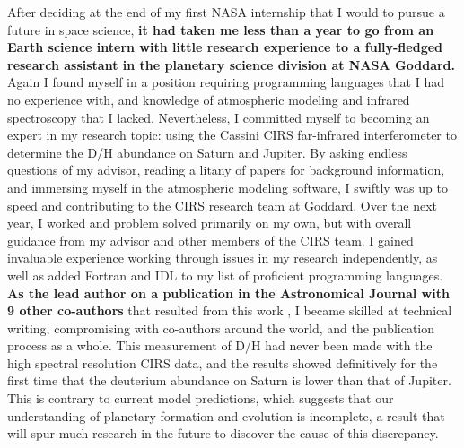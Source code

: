 After deciding at the end of my  first NASA internship that I would to
pursue a future in space science, \textbf{it  had taken me less than a year to
go from an  Earth science intern with little research  experience to a
fully-fledged research assistant in  the planetary science division at
NASA Goddard.}  Again  I found  myself in  a position  requiring programming
languages that I had no  experience with, and knowledge of atmospheric
modeling  and infrared  spectroscopy that  I lacked.   Nevertheless, I
committed myself to becoming an expert in my research topic: using the
Cassini  CIRS   far-infrared  interferometer  to  determine   the  D/H
abundance on  Saturn and  Jupiter. By asking  endless questions  of my
advisor, reading  a litany of  papers for background  information, and
immersing myself in  the atmospheric modeling software,  I swiftly was
up  to   speed  and  contributing   to  the  CIRS  research   team  at
Goddard. Over the next year, I  worked and problem solved primarily on
my own, but with overall guidance from my advisor and other members of
the CIRS team.  I gained  invaluable experience working through issues
in my research  independently, as well as added Fortran  and IDL to my
list of  proficient programming  languages.  \textbf{As the  lead author  on a
publication in the  Astronomical Journal with 9  other co-authors} that
resulted  from  this work  \citep{Pierel:2017},  I  became skilled  at
technical writing, compromising with  co-authors around the world, and
the publication process as a whole.  This measurement of D/H had never
been made with the high spectral resolution CIRS data, and the results
showed definitively for the first time that the deuterium abundance on
Saturn is  lower than  that of  Jupiter. This  is contrary  to current
model predictions, which suggests  that our understanding of planetary
formation and  evolution is incomplete,  a result that will  spur much
research in the future to discover the cause of this discrepancy.

